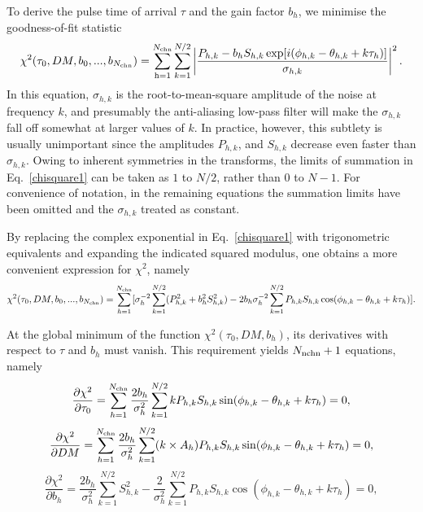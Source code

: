 \documentclass[useAMS,usenatbib]{mn2e}
\begin{document}
\begin{appendix}

To derive the pulse time of arrival $\tau$ and the gain factor $b_{h}$, we minimise the 
goodness-of-fit statistic
%
\begin{equation}
\label{chisquare1}
\chi^{2}(\tau_{0},DM,b_{0},...,b_{N_{\rm{chn}}})=\sum_{\rm{h}=1}^{N_{\rm{chn}}}\sum_{k=1}^{N/2}\left|\frac{P_{h,k}-b_{h}S_{h,k}\exp[i(\phi_{h,k}-\theta_{h,k}+k\tau_{h})]}{\sigma_{h,k}}\right|^2.
\end{equation}
%
In this equation, $\sigma_{h,k}$ is the root-to-mean-square amplitude of the noise 
at frequency $k$, and presumably the anti-aliasing low-pass filter will make the $\sigma_{h,k}$
fall off somewhat at larger values of $k$. In practice, however, this subtlety is usually 
unimportant since the amplitudes $P_{h,k}$, and $S_{h,k}$ decrease even faster 
than $\sigma_{h,k}$. Owing to inherent symmetries in the transforms, the limits of summation 
in Eq.~\ref{chisquare1} can be taken as $1$ to $N/2$, rather than 0 to $N-1$. For convenience of notation, 
in the remaining equations the summation limits have been omitted and the $\sigma_{h,k}$ 
treated as constant.
%

By replacing the complex exponential in Eq.~\ref{chisquare1} with trigonometric equivalents and
expanding the indicated squared modulus, one obtains a more convenient expression
for $\chi^2$, namely
%
\begin{equation}
\label{chisquare2}
\chi^{2}(\tau_{0},DM,b_{0},...,b_{N_{\rm{chn}}})=\sum_{h=1}^{N_{\rm{chn}}}[\sigma_{h}^{-2}\sum_{k=1}^{N/2}(P_{h,k}^2+b_{h}^{2}S_{h,k}^2)-2b_{h}\sigma_{h}^{-2}\sum_{k=1}^{N/2}P_{h,k}S_{h,k}\cos(\phi_{h,k}-\theta_{h,k}+k\tau_{h})].
\end{equation}
%

At the global minimum of the function $\chi^2(\tau_{0},DM,b_h)$, its derivatives with
respect to $\tau$ and $b_h$ must vanish. This requirement yields $N_{\rm{nchn}}+1$ 
equations, namely
%
\begin{equation}
\label{dtau}
\frac{\partial\chi^2}{\partial\tau_{0}}=\sum_{h=1}^{N_{\rm{chn}}}\frac{2b_h}{\sigma_{h}^2}\sum_{k=1}^{N/2}kP_{h,k}S_{h,k}\sin(\phi_{h,k}-\theta_{h,k}+k\tau_{h})=0,
\end{equation}
%
\begin{equation}
\label{ddm}
\frac{\partial\chi^2}{\partial DM}=\sum_{h=1}^{N_{\rm{chn}}}\frac{2b_h}{\sigma_{h}^2}\sum_{k=1}^{N/2}(k\times A_{h})P_{h,k}S_{h,k}\sin(\phi_{h,k}-\theta_{h,k}+k\tau_{h})=0,
\end{equation}
%
\begin{equation}
\label{db}
\frac{\partial\chi^2}{\partial b_h}=\frac{2b_h}{\sigma_{h}^2}\sum_{k=1}^{N/2}S_{h,k}^2-\frac{2}{\sigma_{h}^2}\sum_{k=1}^{N/2}P_{h,k}S_{h,k}\cos(\phi_{h,k}-\theta_{h,k}+k\tau_{h})=0,
\end{equation}
%


\end{appendix}
\end{document}
